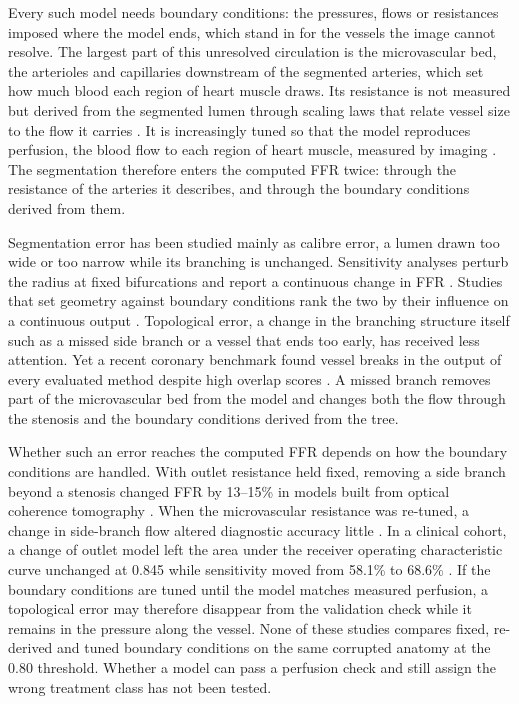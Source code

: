 \documentclass[journal]{IEEEtran}
\begin{document}
Every such model needs boundary conditions: the pressures, flows or resistances imposed where the model ends, which
stand in for the vessels the image cannot resolve. The largest part of this unresolved circulation is the
microvascular bed, the arterioles and capillaries downstream of the segmented arteries, which set how much blood
each region of heart muscle draws. Its resistance is not measured but derived from the segmented lumen through
scaling laws that relate vessel size to the flow it carries \cite{murray1926,kim2010}. It is increasingly tuned so
that the model reproduces perfusion, the blood flow to each region of heart muscle, measured by imaging
\cite{menon2024}. The segmentation therefore enters the computed FFR twice: through the resistance of
the arteries it describes, and through the boundary conditions derived from them.

Segmentation error has been studied mainly as calibre error, a lumen drawn too wide or too narrow while its
branching is unchanged. Sensitivity analyses perturb the radius at fixed bifurcations and report a continuous
change in FFR \cite{sankaran2015tmi,sankaran2015cmame,fernandez2024,dalmaso2025}. Studies that set geometry against
boundary conditions rank the two by their influence on a continuous output
\cite{sankaran2016,tanade2022,colebank2019,korte2023}. Topological error, a change in the branching structure
itself such as a missed side branch or a vessel that ends too early, has received less attention. Yet a recent
coronary benchmark found vessel breaks in the output of every evaluated method despite high overlap scores
\cite{bransby2026}. A missed branch removes part of the microvascular bed from the model and changes both the flow
through the stenosis and the boundary conditions derived from the tree.

Whether such an error reaches the computed FFR depends on how the boundary conditions are handled. With outlet
resistance held fixed, removing a side branch beyond a stenosis changed FFR by 13--15\% in models built from
optical coherence tomography \cite{gamage2022}. When the microvascular resistance was re-tuned, a change in
side-branch flow altered diagnostic accuracy little \cite{gosling2020}. In a clinical cohort, a change of outlet
model left the area under the receiver operating characteristic curve unchanged at 0.845 while sensitivity moved
from 58.1\% to 68.6\% \cite{fossan2026}. If the boundary conditions are tuned until the model matches measured
perfusion, a topological error may therefore disappear from the validation check while it remains in the pressure
along the vessel. None of these studies compares fixed, re-derived and tuned boundary conditions on the same
corrupted anatomy at the 0.80 threshold. Whether a model can pass a perfusion check and still assign the wrong
treatment class has not been tested.
\end{document}
